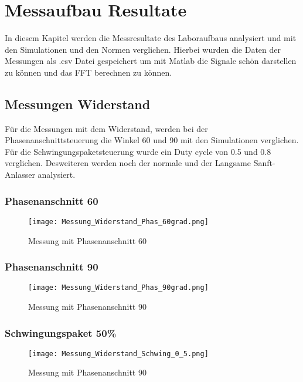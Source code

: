 \section{Messaufbau Resultate}
In diesem Kapitel werden die Messresultate des Laboraufbaus analysiert und mit den Simulationen und den Normen verglichen. Hierbei wurden die Daten der Messungen als .csv Datei gespeichert um mit Matlab die Signale schön darstellen zu können und das FFT berechnen zu können. 

\subsection{Messungen Widerstand}
Für die Messungen mit dem Widerstand, werden bei der Phasenanschnittsteuerung die Winkel 60\textdegree \hspace{0.02cm} und 90\textdegree \hspace{0.02cm} mit den Simulationen verglichen. Für die Schwingungspaketsteuerung wurde ein Duty cycle von 0.5 und 0.8 verglichen. Desweiteren werden noch der normale und der Langsame Sanft-Anlasser analysiert.
\subsubsection{Phasenanschnitt 60\textdegree}

\begin{figure}[ht!]
	\centering
	\texttt{[image: Messung\_Widerstand\_Phas\_60grad.png]}	
	\caption{Messung mit Phasenanschnitt 60\textdegree}\label{fig:Mess_Phas_60}
\end{figure}
\newpage
\subsubsection{Phasenanschnitt 90\textdegree}
\begin{figure}[ht!]
	\centering
	\texttt{[image: Messung\_Widerstand\_Phas\_90grad.png]}	
	\caption{Messung mit Phasenanschnitt 90\textdegree}\label{fig:Mess_Phas_90}
\end{figure}

\newpage
\subsubsection{Schwingungspaket 50\%}
\begin{figure}[ht!]
	\centering
	\texttt{[image: Messung\_Widerstand\_Schwing\_0\_5.png]}	
	\caption{Messung mit Phasenanschnitt 90\textdegree}\label{fig:Mess_Schwing_50}
\end{figure}

